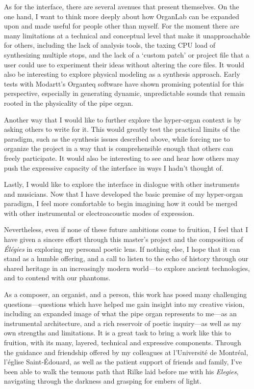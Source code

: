 \documentclass[12pt,twoside,maitrise]{dms_ks}
\theoremstyle{definition}
\begin{document}
{As for the interface, there are several avenues that present themselves. 
On the one hand, I want to think more deeply about how OrganLab can be expanded upon and made useful for people other than myself. 
For the moment there are many limitations at a technical and conceptual level that make it unapproachable for others, including the lack of analysis tools, the taxing CPU load of synthesizing multiple stops, and the lack of a `custom patch' or project file that a user could use to experiment their ideas without altering the core files. 
It would also be interesting to explore physical modeling as a synthesis approach.
Early tests with Modartt's Organteq software have shown promising potential for this perspective, especially in generating dynamic, unpredictable sounds that remain rooted in the physicality of the pipe organ.

Another way that I would like to further explore the hyper-organ context is by asking others to write for it. 
This would greatly test the practical limits of the paradigm, such as the synthesis issues described above, while forcing me to organize the project in a way that is comprehensible enough that others can freely participate. 
It would also be interesting to see and hear how others may push the expressive capacity of the interface in ways I hadn't thought of.

Lastly, I would like to explore the interface in dialogue with other instruments and musicians. 
Now that I have developed the basic premise of my hyper-organ paradigm, I feel more comfortable to begin imagining how it could be merged with other instrumental or electroacoustic modes of expression.

Nevertheless, even if none of these future ambitions come to fruition, I feel that I have given a sincere effort through this master's project and the composition of \textit{Élégies} in exploring my personal poetic lens. 
If nothing else, I hope that it can stand as a humble offering, and a call to listen to the echo of history through our shared heritage in an increasingly modern world---to explore ancient technologies, and to contend with our phantoms.

As a composer, an organist, and a person, this work has posed many challenging questions---questions which have helped me gain insight into my creative vision, including an expanded image of what the pipe organ represents to me---as an instrumental architecture, and a rich reservoir of poetic inquiry---as well as my own strengths and limitations. 
It is a great task to bring a work like this to fruition, with its many, layered, technical and expressive components. 
Through the guidance and friendship offered by my colleagues at l'Université de Montréal, l'église Saint-Édouard, as well as the patient support of friends and family, I've been able to walk the tenuous path that Rilke laid before me with his \textit{Elegies}, navigating through the darkness and grasping for embers of light. 

}
\end{document}
